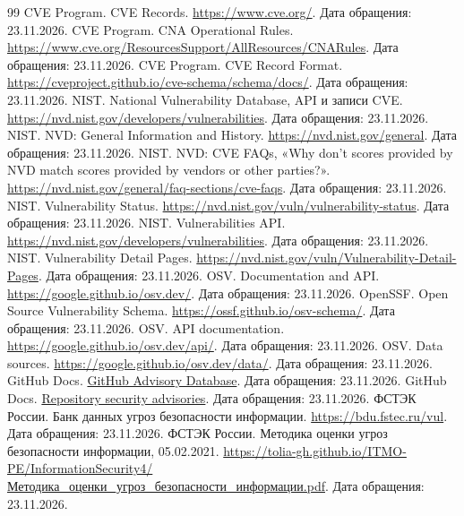 \documentclass[12pt,a4paper]{report}
\begin{document}
\begin{thebibliography}{99}
 CVE Program. CVE Records. \url{https://www.cve.org/}. Дата обращения: 23.11.2026.
 CVE Program. CNA Operational Rules. \url{https://www.cve.org/ResourcesSupport/AllResources/CNARules}. Дата обращения: 23.11.2026.
 CVE Program. CVE Record Format. \url{https://cveproject.github.io/cve-schema/schema/docs/}. Дата обращения: 23.11.2026.
 NIST. National Vulnerability Database, API и записи CVE. \url{https://nvd.nist.gov/developers/vulnerabilities}. Дата обращения: 23.11.2026.
 NIST. NVD: General Information and History. \url{https://nvd.nist.gov/general}. Дата обращения: 23.11.2026.
 NIST. NVD: CVE FAQs, «Why don't scores provided by NVD match scores provided by vendors or other parties?». \url{https://nvd.nist.gov/general/faq-sections/cve-faqs}. Дата обращения: 23.11.2026.
 NIST. Vulnerability Status. \url{https://nvd.nist.gov/vuln/vulnerability-status}. Дата обращения: 23.11.2026.
 NIST. Vulnerabilities API. \url{https://nvd.nist.gov/developers/vulnerabilities}. Дата обращения: 23.11.2026.
 NIST. Vulnerability Detail Pages. \url{https://nvd.nist.gov/vuln/Vulnerability-Detail-Pages}. Дата обращения: 23.11.2026.
 OSV. Documentation and API. \url{https://google.github.io/osv.dev/}. Дата обращения: 23.11.2026.
 OpenSSF. Open Source Vulnerability Schema. \url{https://ossf.github.io/osv-schema/}. Дата обращения: 23.11.2026.
 OSV. API documentation. \url{https://google.github.io/osv.dev/api/}. Дата обращения: 23.11.2026.
 OSV. Data sources. \url{https://google.github.io/osv.dev/data/}. Дата обращения: 23.11.2026.
 GitHub Docs. \href{https://docs.github.com/en/code-security/concepts/vulnerability-reporting-and-management/github-advisory-database}{GitHub Advisory Database}. Дата обращения: 23.11.2026.
 GitHub Docs. \href{https://docs.github.com/en/code-security/concepts/vulnerability-reporting-and-management/repository-security-advisories}{Repository security advisories}. Дата обращения: 23.11.2026.
 ФСТЭК России. Банк данных угроз безопасности информации. \url{https://bdu.fstec.ru/vul}. Дата обращения: 23.11.2026.
 ФСТЭК России. Методика оценки угроз безопасности информации, 05.02.2021. \url{https://tolia-gh.github.io/ITMO-PE/InformationSecurity4/Методика_оценки_угроз_безопасности_информации.pdf}. Дата обращения: 23.11.2026.

\end{thebibliography}
\end{document}
